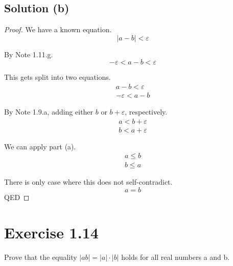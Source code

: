 \documentclass[12pt]{report}
\begin{document}
\subsection{Solution (b)}
\begin{proof}
    We have a known equation.
    \begin{equation}
        |a - b| < \varepsilon
    \end{equation}

    By Note 1.11.g.
    \begin{equation}
        -\varepsilon < a - b < \varepsilon
    \end{equation}

    This gets split into two equations.
    \begin{gather}
        a - b < \varepsilon\\
        -\varepsilon < a - b
    \end{gather}

    By Note 1.9.a, adding either $b$ or $b + \varepsilon$, respectively.
    \begin{gather}
        a < b + \varepsilon\\
        b < a + \varepsilon
    \end{gather}

    We can apply part (a).
    \begin{gather}
        a \le b\\
        b \le a
    \end{gather}

    There is only case where this does not self-contradict.
    \begin{equation}
        a = b
    \end{equation}
    QED
\end{proof}


\pagebreak
\section{Exercise 1.14}
Prove that the equality $\left|ab\right| = \left|a\right|\cdot\left|b\right|$ holds for  all real numbers a and b. 
\end{document}
